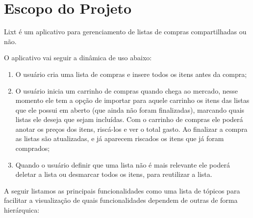 \section{Escopo do Projeto}

Lixt é um aplicativo para gerenciamento de listas de compras compartilhadas ou não.

O aplicativo vai seguir a dinâmica de uso abaixo:
\begin{enumerate}
	\item O usuário cria uma lista de compras e insere todos os itens antes da compra;
	\item O usuário inicia um carrinho de compras quando chega ao mercado, nesse momento ele tem a opção de importar para aquele carrinho os itens das listas que ele possui em aberto (que ainda não foram finalizadas), marcando quais listas ele deseja que sejam incluídas. Com o carrinho de compras ele poderá anotar os preços dos itens, riscá-los e ver o total gasto. Ao finalizar a compra as listas são atualizadas, e já aparecem riscados os itens que já foram comprados;
	\item Quando o usuário definir que uma lista não é mais relevante ele poderá deletar a lista ou desmarcar todos os itens, para reutilizar a lista.
\end{enumerate}

A seguir listamos as principais funcionalidades como uma lista de tópicos para facilitar a visualização de quais funcionalidades dependem de outras de forma hierárquica:


